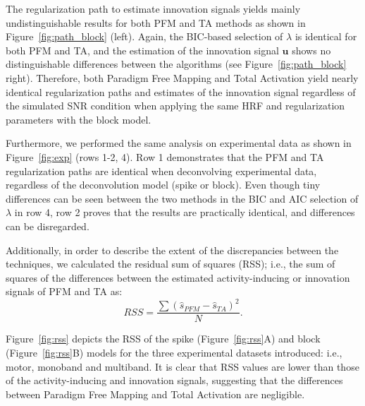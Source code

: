 The regularization path to estimate innovation signals yields mainly undistinguishable results for both PFM and TA methods as shown in Figure~\ref{fig:path_block} (left). Again, the BIC-based selection of \(\lambda\) is identical for both PFM and TA, and the estimation of the innovation signal \(\mathbf{u}\) shows no distinguishable differences between the algorithms (see Figure~\ref{fig:path_block} right). Therefore, both Paradigm Free Mapping and Total Activation yield nearly identical regularization paths and estimates of the innovation signal regardless of the simulated SNR condition when applying the same HRF and regularization parameters with the block model.

Furthermore, we performed the same analysis on experimental data as shown in Figure~\ref{fig:exp} (rows 1-2, 4). Row 1 demonstrates that the PFM and TA regularization paths are identical when deconvolving experimental data, regardless of the deconvolution model (spike or block). Even though tiny differences can be seen between the two methods in the BIC and AIC selection of \(\lambda\) in row 4, row 2 proves that the results are practically identical, and differences can be disregarded.

Additionally, in order to describe the extent of the discrepancies between the techniques, we calculated the residual sum of squares (RSS); i.e., the sum of squares of the differences between the estimated activity-inducing or innovation signals of PFM and TA as:
\begin{equation}
    RSS = \frac{\sum{(\hat{s}_{PFM} - \hat{s}_{TA})^2}}{N}.
\end{equation}

Figure~\ref{fig:rss} depicts the RSS of the spike (Figure~\ref{fig:rss}A) and block (Figure~\ref{fig:rss}B) models for the three experimental datasets introduced: i.e., motor, monoband and multiband. It is clear that RSS values are lower than those of the activity-inducing and innovation signals, suggesting that the differences between Paradigm Free Mapping and Total Activation are negligible.
